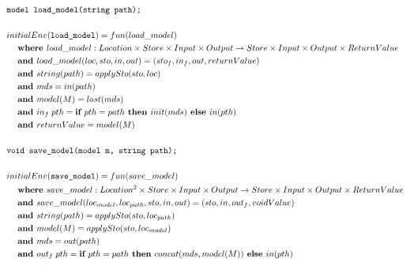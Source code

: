 \documentclass[12pt]{article}
\begin{document}
\begin{align*}
	&\texttt{model load\_model(string path);} \\
	\\
&initialEnv(\texttt{load\_model}) = fun(load\_model) \\
&\hspace{3ex}\textbf{where } load\_model:Location\times Store\times Input\times Output \rightarrow Store\times Input\times Output\times ReturnValue \\
&\hspace{3ex}\textbf{and } load\_model(loc,sto,in,out) = (sto_f,in_f,out, returnValue)\\
&\hspace{3ex}\textbf{and } string(path) = applySto(sto,loc) \\
&\hspace{3ex}\textbf{and } mds = in(path) \\
&\hspace{3ex}\textbf{and } model(M) = last(mds) \\
&\hspace{3ex}\textbf{and } in_f\; pth = \textbf{if } pth = path \textbf{ then } init(mds)\textbf{ else } in(pth) \\
&\hspace{3ex}\textbf{and } returnValue = model(M) \\
\\
	&\texttt{void save\_model(model m, string path);} \\
	\\
&initialEnv(\texttt{save\_model}) = fun(save\_model) \\
&\hspace{3ex}\textbf{where } save\_model:Location^2\times Store\times Input\times Output\rightarrow Store\times Input\times Output\times ReturnValue \\
&\hspace{3ex}\textbf{and } save\_model(loc_{model}, loc_{path},sto,in,out) = (sto,in,out_f,voidValue)\\
&\hspace{3ex}\textbf{and } string(path) = applySto(sto,loc_{path}) \\
&\hspace{3ex}\textbf{and } model(M) = applySto(sto,loc_{model}) \\
&\hspace{3ex}\textbf{and } mds = out(path) \\
&\hspace{3ex}\textbf{and } out_f\; pth = \textbf{if } pth = path \textbf{ then } concat(mds, model(M))\textbf{ else } in(pth) \\
\end{align*}
\end{document}
